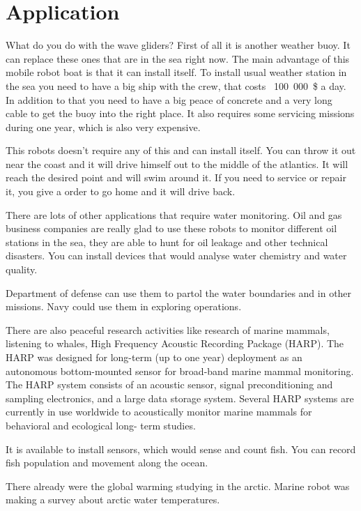 \section{Application}

What do you do with the wave gliders? First of all it is another weather buoy. It can replace these ones that are in the sea right now. The main advantage of this mobile robot boat is that it can install itself. To install usual weather station in the sea you need to have a big ship with the crew, that costs \mbox{ 100 000 \$} a day. In addition to that you need to have a  big peace of concrete and a very long cable to get the buoy into the right place.  It also requires some servicing missions during one year, which is also very expensive.

This robots doesn't require any of this and can install itself. You can throw it
out near the coast and it will drive himself out to the middle of the atlantics. It will reach the desired point and will swim around it. If you need to service or repair it, you give a  order to go home and it will drive back.

There are lots of other applications that require water monitoring. Oil and gas business companies are really glad to use these robots to monitor different oil stations in the sea, they are able to hunt for oil  leakage and other technical disasters.  You can install devices that would analyse water chemistry and water quality.

Department of defense can use them to partol  the water boundaries and in other missions. Navy could use them in exploring operations.

There are also peaceful research activities like research of marine mammals, listening to whales, High Frequency  Acoustic Recording Package (HARP). The HARP was designed for long-term (up to one year) deployment as an autonomous bottom-mounted sensor for broad-band marine mammal monitoring. The HARP system consists of an acoustic sensor, signal preconditioning and sampling electronics, and a large data storage system. Several HARP systems are currently in use worldwide to acoustically monitor marine mammals for behavioral and ecological long- term studies.

It is available to install sensors, which would sense and count fish. You can record fish population and movement along the ocean.

There already were  the global warming studying in the arctic. Marine robot was making a survey about arctic water temperatures.

